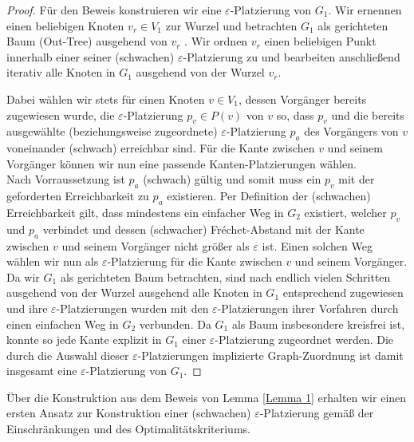 \documentclass[a4paper, 12pt, twoside]{article}
\theoremstyle{Format1} %
\begin{document}
\begin{proof}
Für den Beweis konstruieren wir eine $\varepsilon$-Platzierung von $G_1$.
Wir ernennen einen beliebigen Knoten $v_r \in V_1$ zur Wurzel und betrachten $G_1$ als gerichteten Baum (Out-Tree) ausgehend von $v_r$ .
Wir ordnen $v_r$ einen beliebigen Punkt innerhalb einer seiner (schwachen) $\varepsilon$-Platzierung zu und bearbeiten anschließend iterativ alle
Knoten in $G_1$ ausgehend von der Wurzel $v_r$.

Dabei wählen wir stets für einen Knoten $v \in V_1$, dessen Vorgänger bereits zugewiesen wurde,
die $\varepsilon$-Platzierung $p_v \in P(v)$ von $v$ so, dass $p_v$
und die bereits ausgewählte (beziehungsweise zugeordnete) $\varepsilon$-Platzierung $p_a$ des Vorgängers von $v$ voneinander (schwach) erreichbar sind.
Für die Kante zwischen $v$ und seinem Vorgänger können wir nun eine passende Kanten-Platzierungen wählen.
\\
Nach Vorraussetzung ist $p_a$ (schwach) gültig und somit muss ein $p_v$ mit der geforderten Erreichbarkeit zu $p_a$ existieren.
Per Definition der (schwachen) Erreichbarkeit gilt, dass mindestens ein einfacher Weg in $G_2$ existiert, welcher $p_v$ und $p_a$ verbindet
und dessen (schwacher) Fréchet-Abstand mit der Kante zwischen $v$ und seinem Vorgänger nicht größer als $\varepsilon$ ist.
Einen solchen Weg wählen wir nun als $\varepsilon$-Platzierung für die Kante zwischen $v$ und seinem Vorgänger.
\\
Da wir $G_1$ als gerichteten Baum betrachten, sind nach endlich vielen Schritten ausgehend von der Wurzel ausgehend alle Knoten in $G_1$
entsprechend zugewiesen und ihre $\varepsilon$-Platzierungen
wurden mit den $\varepsilon$-Platzierungen ihrer Vorfahren durch einen einfachen Weg in $G_2$ verbunden.
Da $G_1$ als Baum insbesondere kreisfrei ist, konnte so jede Kante explizit in $G_1$ einer $\varepsilon$-Platzierung zugeordnet werden.
Die durch die Auswahl dieser $\varepsilon$-Platzierungen implizierte Graph-Zuordnung ist damit insgesamt eine $\varepsilon$-Platzierung von $G_1$.
\end{proof}

Über die Konstruktion aus dem Beweis von Lemma \ref{Lemma 1} erhalten wir einen ersten Ansatz zur Konstruktion einer (schwachen) $\varepsilon$-Platzierung
gemäß der Einschränkungen und des Optimalitätskriteriums.
\end{document}
